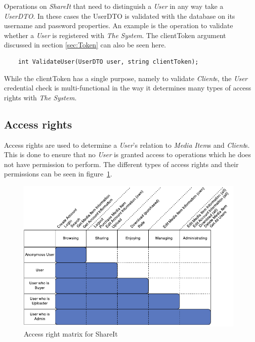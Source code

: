 \documentclass[../report.tex]{subfiles}
\begin{document}
Operations on \textit{ShareIt} that need to distinguish a \textit{User} in any way take a \textit{UserDTO}. In these cases the UserDTO is validated with the database on its username and password properties. An example is the operation to validate whether a \textit{User} is registered with \textit{The System}. The clientToken argument discussed in section \ref{sec:Token} can also be seen here. 

\begin{center}
\begin{lstlisting}
	int ValidateUser(UserDTO user, string clientToken);
\end{lstlisting}
\end{center}


While the clientToken has a single purpose, namely to validate \textit{Client}s, the \textit{User} credential check is multi-functional in the way it determines many types of access rights with \textit{The System}.


\subsection{Access rights}


Access rights are used to determine a \textit{User}'s relation to \textit{Media Item}s and \textit{Client}s. This is done to ensure that no \textit{User} is granted access to operations which he does not have permission to perform. The different types of access rights and their permissions can be seen in figure~\ref{fig:accessrightmatrix}. 

\begin{figure}[H]
\centering \includegraphics{AccessRightMatrix.pdf}
\caption{Access right matrix for ShareIt}
\label{fig:accessrightmatrix}
\end{figure}
\end{document}
